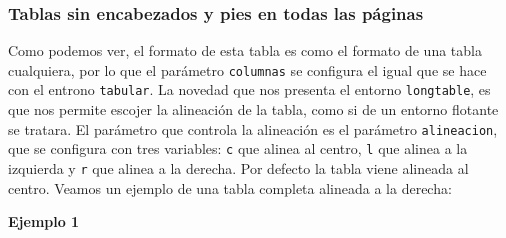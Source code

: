 	
	\subsubsection{Tablas sin encabezados y pies en todas las páginas}
	
	Como podemos ver, el formato de esta tabla es como el formato de una tabla cualquiera, por lo que el parámetro \verb|columnas| se configura el igual que se hace con el entrono \verb|tabular|. La novedad que nos presenta el entorno \verb|longtable|, es que nos permite escojer la alineación de la tabla, como si de un entorno flotante se tratara. El parámetro que controla la alineación es el parámetro \verb|alineacion|, que se configura con tres variables: \verb|c| que alinea al centro, \verb|l| que alinea a la izquierda y \verb|r| que alinea a la derecha. Por defecto la tabla viene alineada al centro. Veamos un ejemplo de una tabla completa alineada a la derecha:
	
	\textbf{Ejemplo 1}
	
